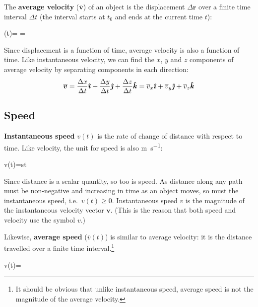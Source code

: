 The \textbf{average velocity} ($\overline{\bm v}$)
of an object is the displacement $\Delta\bm r$ over a finite time interval
$\Delta t$ (the interval starts at $t_0$ and ends at the current time $t$):
\begin{important-equation}
  (t)= 
  =
\end{important-equation}
Since displacement is a function of time, average velocity is also a function
of time. Like instantaneous velocity, we can find the $x$, $y$ and $z$
components of average velocity by separating components in each direction:
\begin{equation*}
  \overline{\bm v}=
  \frac{\Delta x}{\Delta t}\bm{\hat\imath} +
  \frac{\Delta y}{\Delta t}\bm{\hat\jmath} +
  \frac{\Delta z}{\Delta t}\bm{\hat k} =
  \overline v_x\bm{\hat\imath} +
  \overline v_y\bm{\hat\jmath} +
  \overline v_z\bm{\hat k}
\end{equation*}



\subsection{Speed}

\textbf{Instantaneous speed} $v(t)$ is the rate of change of distance with
respect to time.
Like velocity, the unit for speed is also \si{\metre\per\second}:
\begin{important-equation}
  v(t)=\diff st
\end{important-equation}
Since distance is a scalar quantity, so too is speed. As distance along any
path must be non-negative and increasing in time as an object moves, so must
the instantaneous speed, i.e.\ $v(t)\geq 0$. Instantaneous speed $v$ is the
magnitude of the instantaneous velocity vector $\bm v$. (This is the reason
that both speed and velocity use the symbol $v$.)

Likewise, \textbf{average speed} ($\overline v(t)$) is similar to average
velocity: it is the distance travelled over a finite time interval.\footnote{It
should be obvious that unlike instantaneous speed, average
speed is not the magnitude of the average velocity.}
\begin{important-equation}
  \overline v(t)=
\end{important-equation}


